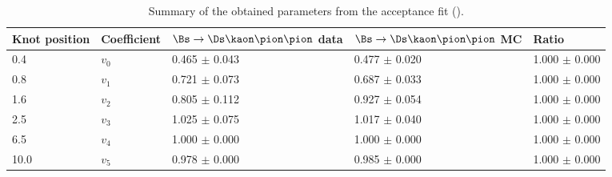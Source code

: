 \begin{table}[h]
\centering
\caption{Summary of the obtained parameters from the acceptance fit ().} 
\begin{tabular}{l l l l l}
\hline
\hline
Knot position & Coefficient & $\Bs\to\Ds\kaon\pion\pion$ data & $\Bs\to\Ds\kaon\pion\pion$ MC & Ratio \\
\hline
0.4 & $v_{0}$ & 0.465 $\pm$ 0.043 & 0.477 $\pm$ 0.020 & 1.000 $\pm$ 0.000\\
0.8 & $v_{1}$ & 0.721 $\pm$ 0.073 & 0.687 $\pm$ 0.033 & 1.000 $\pm$ 0.000\\
1.6 & $v_{2}$ & 0.805 $\pm$ 0.112 & 0.927 $\pm$ 0.054 & 1.000 $\pm$ 0.000\\
2.5 & $v_{3}$ & 1.025 $\pm$ 0.075 & 1.017 $\pm$ 0.040 & 1.000 $\pm$ 0.000\\
6.5 & $v_{4}$ & 1.000 $\pm$ 0.000 & 1.000 $\pm$ 0.000 & 1.000 $\pm$ 0.000\\
10.0 & $v_{5}$ & 0.978 $\pm$ 0.000 & 0.985 $\pm$ 0.000 & 1.000 $\pm$ 0.000\\
\hline
\hline
\end{tabular}
\label{table:splines}
\end{table}
